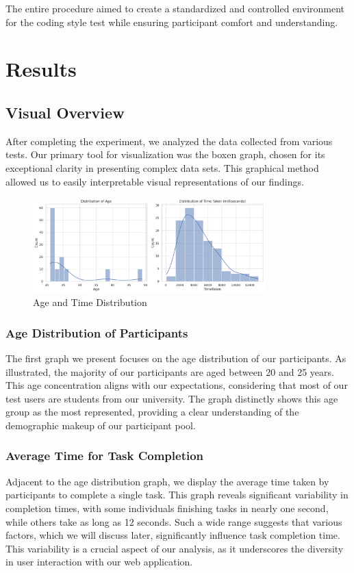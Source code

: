\documentclass{article}
\begin{document}
The entire procedure aimed to create a standardized and controlled environment for the coding style test while ensuring participant comfort and understanding.


\section{Results}
\subsection{Visual Overview}

After completing the experiment, we analyzed the data collected from various tests. Our primary tool for visualization was the boxen graph, chosen for its exceptional clarity in presenting complex data sets. This graphical method allowed us to easily interpretable visual representations of our findings.

\begin{figure}[H]
    \centering
    \includegraphics[width=0.8\textwidth]{distribution_age.png}
    \caption{Age and Time Distribution}
\end{figure}

\subsubsection*{Age Distribution of Participants}
The first graph we present focuses on the age distribution of our participants. As illustrated, the majority of our participants are aged between 20 and 25 years. This age concentration aligns with our expectations, considering that most of our test users are students from our university. The graph distinctly shows this age group as the most represented, providing a clear understanding of the demographic makeup of our participant pool.

\subsubsection*{Average Time for Task Completion}
Adjacent to the age distribution graph, we display the average time taken by participants to complete a single task. This graph reveals significant variability in completion times, with some individuals finishing tasks in nearly one second, while others take as long as 12 seconds. Such a wide range suggests that various factors, which we will discuss later, significantly influence task completion time. This variability is a crucial aspect of our analysis, as it underscores the diversity in user interaction with our web application.
\end{document}
